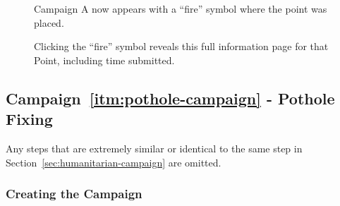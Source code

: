 \documentclass{article}
\begin{document}
		\begin{figure}[H]
			\centering
			\caption{Campaign A now appears with a ``fire'' symbol where the point was placed.}
			\label{fig:eval-submita-3}
		\end{figure}

		\begin{figure}[H]
			\centering
			\caption{Clicking the ``fire'' symbol reveals this full information page for that Point, including time submitted.}
			\label{fig:eval-submita-4}
		\end{figure}

		\subsection{Campaign~\ref{itm:pothole-campaign} - Pothole Fixing}
		\label{sec:pothole-campaign}

		Any steps that are extremely similar or identical to the same step in Section~\ref{sec:humanitarian-campaign} are omitted.

		\subsubsection{Creating the Campaign}
\end{document}
